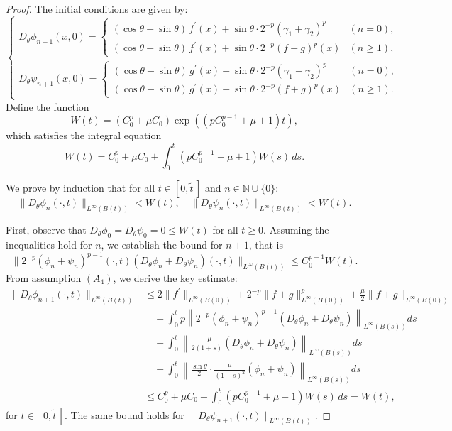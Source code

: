 \documentclass[10pt,a4paper]{amsart}
\begin{document}
\begin{proof}
The initial conditions are given by:
$$
\begin{cases}
D_\theta \phi_{n+1}(x,0) = 
\begin{cases}
(\cos\theta+\sin\theta)\,f^\prime(x) + \sin\theta\cdot 2^{-p}(\gamma_1+\gamma_2)^p & (n = 0), \\
(\cos\theta+\sin\theta)\,f^\prime(x) + \sin\theta\cdot 2^{-p}(f+g)^p(x) & (n \geq 1),
\end{cases} \\[6pt]
D_\theta \psi_{n+1}(x,0) = 
\begin{cases}
(\cos\theta-\sin\theta)\,g^\prime(x) + \sin\theta\cdot 2^{-p}(\gamma_1+\gamma_2)^p & (n = 0), \\
(\cos\theta-\sin\theta)\,g^\prime(x) + \sin\theta\cdot 2^{-p}(f+g)^p(x) & (n \geq 1).
\end{cases}
\end{cases}
$$
\noindent Define the function
$$
W(t) = (C_0^p + \mu C_0) \exp\left((pC_0^{p-1} + \mu + 1) t\right),
$$
which satisfies the integral equation
\begin{equation}
W(t) = C_0^p + \mu C_0 + \int_0^t (pC_0^{p-1} + \mu + 1) W(s) \, ds.
\label{eq:2.4a}
\end{equation}

We prove by induction that for all $t \in [0, \tilde{t}\,]$ and $n \in \mathbb{N} \cup \{0\}$:
\begin{equation}
\|D_\theta \phi_n(\cdot, t)\|_{L^\infty(B(t))} < W(t), \quad 
\|D_\theta \psi_n(\cdot, t)\|_{L^\infty(B(t))} < W(t).
\label{eq:2.5}
\end{equation}

First, observe that $D_\theta \phi_0 = D_\theta \psi_0 = 0 \leq W(t)$ for all $t \geq 0$. Assuming the inequalities hold for $n$, we establish the bound for $n+1$, that is
\begin{equation}
\|2^{-p} (\phi_n + \psi_n)^{p-1} (\cdot, t) (D_\theta \phi_n + D_\theta \psi_n) (\cdot, t)\|_{L^\infty(B(t))} \leq C_0^{p-1} W(t).
\label{eq:2.6}
\end{equation}
From assumption $(A_4)$, we derive the key estimate:
\begin{equation}
\begin{aligned}
\|D_\theta \phi_{n+1}(\cdot, t)\|_{L^\infty(B(t))} 
&\leq 2 \|f^\prime\|_{L^\infty(B(0))} + 2^{-p} \|f + g\|_{L^\infty(B(0))}^p + \frac{\mu}{2} \|f + g\|_{L^\infty(B(0))} \\
&\quad + \int_0^t p \left\| 2^{-p} (\phi_n + \psi_n)^{p-1} (D_\theta \phi_n + D_\theta \psi_n) \right\|_{L^\infty(B(s))} ds \\
&\quad + \int_0^t \left\| \frac{-\mu}{2(1+s)} (D_\theta \phi_n + D_\theta \psi_n) \right\|_{L^\infty(B(s))} ds \\
&\quad + \int_0^t \left\| \frac{\sin \theta}{2} \cdot \frac{\mu}{(1+s)^2} (\phi_n + \psi_n) \right\|_{L^\infty(B(s))} ds \\
&\leq C_0^p + \mu C_0 + \int_0^t (p C_0^{p-1} + \mu + 1) W(s) \, ds = W(t),
\end{aligned}
\label{eq:2.7}
\end{equation}
for $t \in [0, \tilde{t}\,]$. The same bound holds for $\|D_\theta \psi_{n+1}(\cdot, t)\|_{L^\infty(B(t))}$.


\end{proof}
\end{document}
